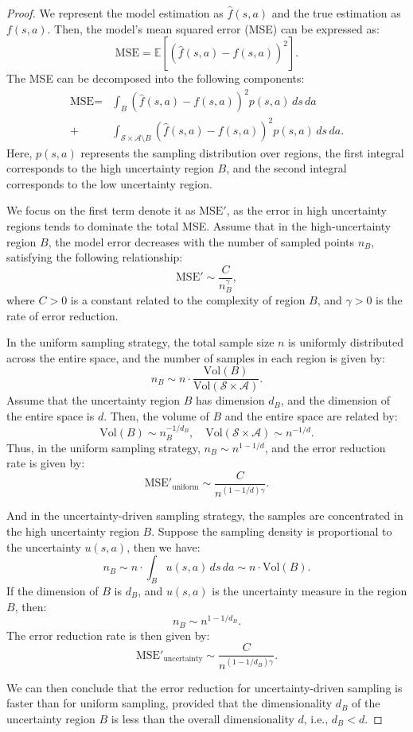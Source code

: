 \documentclass[letterpaper]{article} %
\begin{document}
\begin{proof}
We represent the model estimation as $\hat{f}(s, a)$ and the true estimation as $f(s,a)$. Then, the model's mean squared error (MSE) can be expressed as:
\[
\text{MSE} = \mathbb{E}[(\hat{f}(s, a) - f(s, a))^2].
\]
The MSE can be decomposed into the following components:
%
\begin{align}
\text{MSE} = & \int_B (\hat{f}(s, a) - f(s, a))^2 p(s, a) \, ds \, da \nonumber \\
+ & \int_{\mathcal{S} \times \mathcal{A} \setminus B} (\hat{f}(s, a) - f(s, a))^2 p(s, a) \, ds \, da. \nonumber
\end{align}%
Here, $p(s, a)$ represents the sampling distribution over regions, the first integral corresponds to the high uncertainty region \(B\), and the second integral corresponds to the low uncertainty region.

We focus on the first term denote it as $\text{MSE}'$, as the error in high uncertainty regions tends to dominate the total MSE. Assume that in the high-uncertainty region \(B\), the model error decreases with the number of sampled points $n_B$, satisfying the following relationship:
\[
\text{MSE}' \sim \frac{C}{n_B^\gamma},
\]
where $C > 0$ is a constant related to the complexity of region \(B\), and $\gamma > 0$ is the rate of error reduction.

In the uniform sampling strategy, the total sample size \(n\) is uniformly distributed across the entire space, and the number of samples in each region is given by:
\[
n_B \sim n \cdot \frac{\text{Vol}(B)}{\text{Vol}(\mathcal{S} \times \mathcal{A})}.
\]
Assume that the uncertainty region \(B\) has dimension \(d_B\), and the dimension of the entire space is \(d\). Then, the volume of \(B\) and the entire space are related by:
\[
\text{Vol}(B) \sim n_B^{-1/d_B}, \quad \text{Vol}(\mathcal{S} \times \mathcal{A}) \sim n^{-1/d}.
\]
Thus, in the uniform sampling strategy, \(n_B \sim n^{1 - 1/d}\), and the error reduction rate is given by:
\[
\text{MSE}'_{\text{uniform}} \sim \frac{C}{n^{(1 - 1/d)\gamma}}.
\]

And in the uncertainty-driven sampling strategy, the samples are concentrated in the high uncertainty region \(B\). Suppose the sampling density is proportional to the uncertainty \(u(s, a)\), then we have:
\[
n_B \sim n \cdot \int_B u(s, a) \, ds \, da \sim n \cdot \text{Vol}(B).
\]
If the dimension of \(B\) is \(d_B\), and \(u(s, a)\) is the uncertainty measure in the region \(B\), then:
\[
n_B \sim n^{1 - 1/d_B}.
\]
The error reduction rate is then given by:
\[
\text{MSE}'_{\text{uncertainty}} \sim \frac{C}{n^{(1 - 1/d_B)\gamma}}.
\]

We can then conclude that the error reduction for uncertainty-driven sampling is faster than for uniform sampling, provided that the dimensionality \(d_B\) of the uncertainty region \(B\) is less than the overall dimensionality \(d\), i.e., \(d_B < d\).

\end{proof}

\fi


\end{document}
